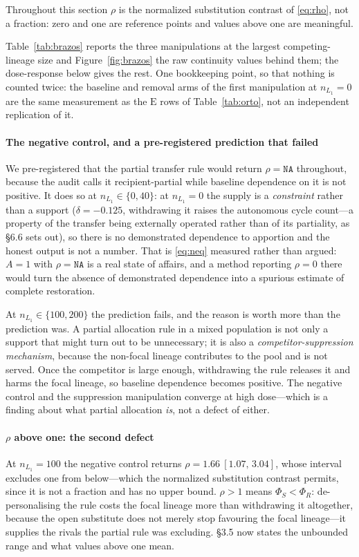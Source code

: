 Throughout this section $\rho$ is the normalized substitution contrast
of \eqref{eq:rho}, not a fraction: zero and one are reference points
and values above one are meaningful.

Table~\ref{tab:brazos} reports the three manipulations at the largest
competing-lineage size and Figure~\ref{fig:brazos} the raw continuity
values behind them; the dose-response below gives the rest. One
bookkeeping point, so that nothing is counted twice: the baseline and
removal arms of the first manipulation at $n_{L_1}=0$ are the same
measurement as the $\mathrm{E}$ rows of Table~\ref{tab:orto}, not an
independent replication of it.

\paragraph{The negative control, and a pre-registered prediction that
failed} We pre-registered that the partial transfer rule would return
$\rho=\texttt{NA}$ throughout, because the audit calls it
recipient-partial while baseline dependence on it is not positive. It
does so at $n_{L_1}\in\{0, 40\}$: at
$n_{L_1}=0$ the supply is a \emph{constraint} rather than a support
($\delta=-0.125$, withdrawing it raises
the autonomous cycle count---a property of the transfer being
externally operated rather than of its partiality, as \S6.6 sets out),
so there is no demonstrated dependence to
apportion and the honest output is not a number. That is \eqref{eq:neq}
measured rather than argued: $A=1$ with $\rho=\texttt{NA}$ is a real
state of affairs, and a method reporting $\rho=0$ there would turn the
absence of demonstrated dependence into a spurious estimate of
complete restoration.

At $n_{L_1}\in\{100, 200\}$ the
prediction fails, and the reason is worth more than the prediction
was. A partial allocation rule in a mixed population is not only a
support that might turn out to be unnecessary; it is also a
\emph{competitor-suppression mechanism}, because the non-focal
lineage contributes to the pool and is not served. Once the
competitor is large enough, withdrawing the rule releases it and
harms the focal lineage, so baseline dependence becomes positive.
The negative control and the suppression manipulation converge at
high dose---which is a finding about what partial allocation
\emph{is}, not a defect of either.

\paragraph{\texorpdfstring{$\rho$}{rho} above one: the second defect}
At $n_{L_1}=100$ the negative control returns
$\rho=1.66~[1.07,\,3.04]$, whose interval excludes one from
below---which the normalized substitution contrast permits, since
it is not a fraction and has no upper bound. $\rho>1$ means
$\Phi_S<\Phi_R$: de-personalising the rule costs the focal lineage more
than withdrawing it altogether, because the open substitute does not
merely stop favouring the focal lineage---it supplies the rivals the
partial rule was excluding. \S3.5 now states the unbounded range and
what values above one mean.

